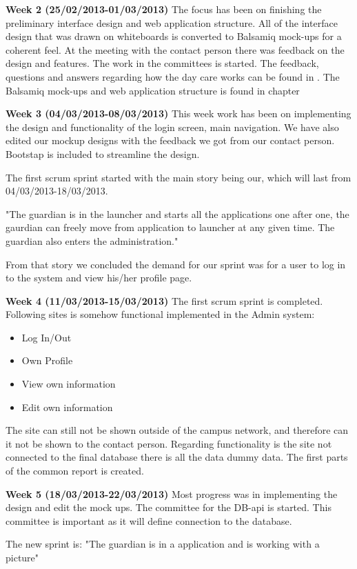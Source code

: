 \textbf{Week 2 (25/02/2013-01/03/2013)}
The focus has been on finishing the preliminary interface design and web application structure.
All of the interface design that was drawn on whiteboards is converted to Balsamiq mock-ups for a coherent feel.
At the meeting with the contact person there was feedback on the design and features. 
The work in the committees is started. 
The feedback, questions and answers regarding how the day care works can be found in .
The Balsamiq mock-ups and web application structure is found in chapter  

\textbf{Week 3 (04/03/2013-08/03/2013)}
This week work has been on implementing the design and functionality of the login screen, main navigation.  
We have also edited our mockup designs with the feedback we got from our contact person. 
Bootstap is included to streamline the design. 

The first scrum sprint started with the main story being  our, which will last from 04/03/2013-18/03/2013. 

"The guardian is in the launcher and starts all the applications one after one, the gaurdian can freely move from application to launcher at any given time.
The guardian also enters the administration."

From that story we concluded the demand for our sprint was for a user to log in to the system and view his/her profile page. 

\textbf{Week 4 (11/03/2013-15/03/2013) }
The first scrum sprint is completed. 
Following sites is somehow functional implemented in the Admin system:
\begin{itemize}
	\item Log In/Out
	\item Own Profile
	\item View own information
	\item Edit own information
\end{itemize}
The site can still not be shown outside of the campus network, and therefore can it not be shown to the contact person.
Regarding functionality is the site not connected to the final database there is all the data dummy data.  
The first parts of the common report is created.

\textbf{Week 5 (18/03/2013-22/03/2013)}
Most progress was in implementing the design and edit the mock ups. The committee for the DB-api is started. This committee is important as it will define connection to the database. 

The new sprint is:
"The guardian is in a application and is working with a picture"


